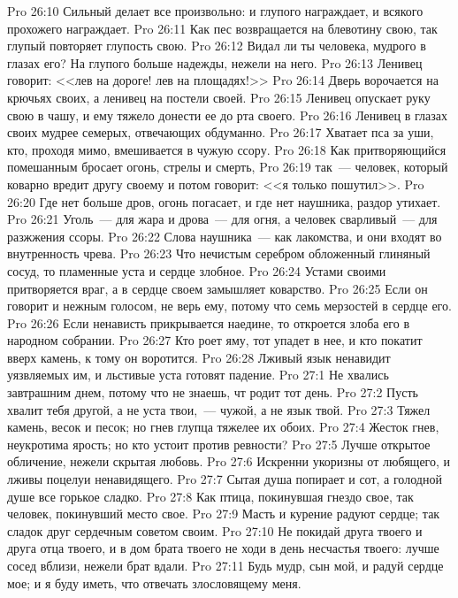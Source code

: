 \vs Pro 26:10 Сильный делает все произвольно: и глупого награждает, и всякого прохожего награждает.
\vs Pro 26:11 Как пес возвращается на блевотину свою, так глупый повторяет глупость свою.
\vs Pro 26:12 Видал ли ты человека, мудрого в глазах его? На глупого больше надежды, нежели на него.
\vs Pro 26:13 Ленивец говорит: <<лев на дороге! лев на площадях!>>
\vs Pro 26:14 Дверь ворочается на крючьях своих, а ленивец на постели своей.
\vs Pro 26:15 Ленивец опускает руку свою в чашу, и ему тяжело донести ее до рта своего.
\vs Pro 26:16 Ленивец в глазах своих мудрее семерых, отвечающих обдуманно.
\vs Pro 26:17 Хватает пса за уши, кто, проходя мимо, вмешивается в чужую ссору.
\vs Pro 26:18 Как притворяющийся помешанным бросает огонь, стрелы и смерть,
\vs Pro 26:19 так~--- человек, который коварно вредит другу своему и потом говорит: <<я только пошутил>>.
\vs Pro 26:20 Где нет больше дров, огонь погасает, и где нет наушника, раздор утихает.
\vs Pro 26:21 Уголь~--- для жара и дрова~--- для огня, а человек сварливый~--- для разжжения ссоры.
\vs Pro 26:22 Слова наушника~--- как лакомства, и они входят во внутренность чрева.
\vs Pro 26:23 Что нечистым серебром обложенный глиняный сосуд, то пламенные уста и сердце злобное.
\vs Pro 26:24 Устами своими притворяется враг, а в сердце своем замышляет коварство.
\vs Pro 26:25 Если он говорит и нежным голосом, не верь ему, потому что семь мерзостей в сердце его.
\vs Pro 26:26 Если ненависть прикрывается наедине, то откроется злоба его в народном собрании.
\vs Pro 26:27 Кто роет яму, тот упадет в нее, и кто покатит вверх камень, к тому он воротится.
\vs Pro 26:28 Лживый язык ненавидит уязвляемых им, и льстивые уста готовят падение.
\vs Pro 27:1 Не хвались завтрашним днем, потому что не знаешь, чт родит тот день.
\vs Pro 27:2 Пусть хвалит тебя другой, а не уста твои,~--- чужой, а не язык твой.
\vs Pro 27:3 Тяжел камень, весок и песок; но гнев глупца тяжелее их обоих.
\vs Pro 27:4 Жесток гнев, неукротима ярость; но кто устоит против ревности?
\vs Pro 27:5 Лучше открытое обличение, нежели скрытая любовь.
\vs Pro 27:6 Искренни укоризны от любящего, и лживы поцелуи ненавидящего.
\vs Pro 27:7 Сытая душа попирает и сот, а голодной душе все горькое сладко.
\vs Pro 27:8 Как птица, покинувшая гнездо свое, так человек, покинувший место свое.
\vs Pro 27:9 Масть и курение радуют сердце; так сладок  друг сердечным советом своим.
\vs Pro 27:10 Не покидай друга твоего и друга отца твоего, и в дом брата твоего не ходи в день несчастья твоего: лучше сосед вблизи, нежели брат вдали.
\rsbpar\vs Pro 27:11 Будь мудр, сын мой, и радуй сердце мое; и я буду иметь, что отвечать злословящему меня.
